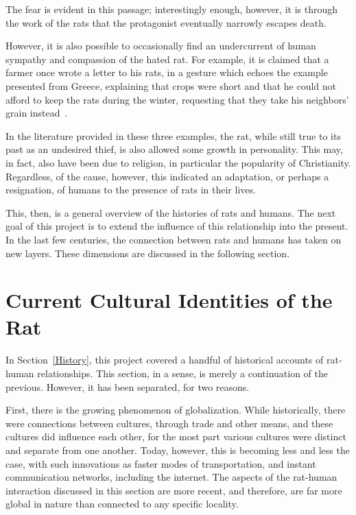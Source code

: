 \documentclass[12pt]{article}
\begin{document}
The fear is evident in this passage; interestingly enough, however, it is through the work of the rats that the protagonist eventually narrowly escapes death.

However, it is also possible to occasionally find an undercurrent of human sympathy and compassion of the hated rat. For example, it is claimed that a farmer once wrote a letter to his rats, in a gesture which echoes the example presented from Greece, explaining that crops were short and that he could not afford to keep the rats during the winter, requesting that they take his neighbors' grain instead~\cite{Barnett2001}.

In the literature provided in these three examples, the rat, while still true to its past as an undesired thief, is also allowed some growth in personality. This may, in fact, also have been due to religion, in particular the popularity of Christianity. Regardless, of the cause, however, this indicated an adaptation, or perhaps a resignation, of humans to the presence of rats in their lives.

This, then, is a general overview of the histories of rats and humans. The next goal of this project is to extend the influence of this relationship into the present. In the last few centuries, the connection between rats and humans has taken on new layers. These dimensions are discussed in the following section.

\section{Current Cultural Identities of the Rat} \label{Identities}

In Section~\ref{History}, this project covered a handful of historical accounts of rat-human relationships. This section, in a sense, is merely a continuation of the previous. However, it has been separated, for two reasons.

First, there is the growing phenomenon of globalization. While historically, there were connections between cultures, through trade and other means, and these cultures did influence each other, for the most part various cultures were distinct and separate from one another. Today, however, this is becoming less and less the case, with such innovations as faster modes of transportation, and instant communication networks, including the internet. The aspects of the rat-human interaction discussed in this section are more recent, and therefore, are far more global in nature than connected to any specific locality.
\end{document}
